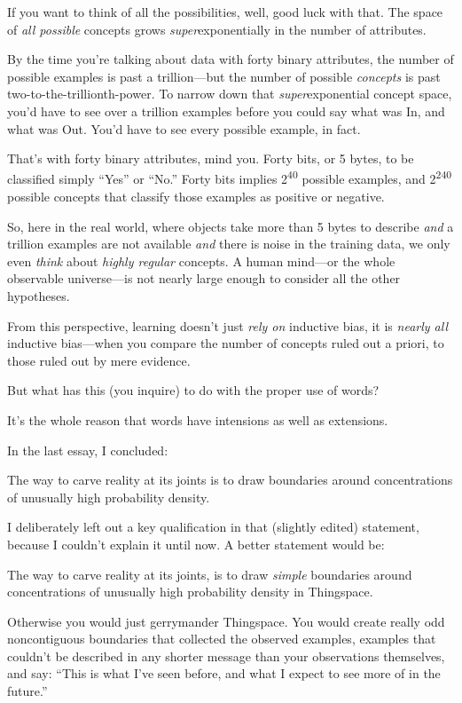 {
 If you want to think of all the possibilities, well, good luck
with that. The space of \textit{all possible} concepts grows
\textit{super}exponentially in the number of attributes.}

{
 By the time you're talking about data with forty
binary attributes, the number of possible examples is past a
trillion---but the number of possible \textit{concepts} is past
two-to-the-trillionth-power. To narrow down that
\textit{super}exponential concept space, you'd have to
see over a trillion examples before you could say what was In, and what
was Out. You'd have to see every possible example, in
fact.}

{
 That's with forty binary attributes, mind you.
Forty bits, or 5 bytes, to be classified simply
``Yes'' or
``No.'' Forty bits implies
2\textsuperscript{40} possible examples, and 2\textsuperscript{240}
possible concepts that classify those examples as positive or
negative.}

{
 So, here in the real world, where objects take more than 5 bytes
to describe \textit{and} a trillion examples are not available
\textit{and} there is noise in the training data, we only even
\textit{think} about \textit{highly regular} concepts. A human
mind---or the whole observable universe---is not nearly large enough to
consider all the other hypotheses.}

{
 From this perspective, learning doesn't just
\textit{rely on} inductive bias, it is \textit{nearly all} inductive
bias---when you compare the number of concepts ruled out a priori, to
those ruled out by mere evidence.}

{
 But what has this (you inquire) to do with the proper use of
words?}

{
 It's the whole reason that words have intensions
as well as extensions.}

{
 In the last essay, I concluded:}

{
 The way to carve reality at its joints is to draw boundaries
around concentrations of unusually high probability density.}

{
 I deliberately left out a key qualification in that (slightly
edited) statement, because I couldn't explain it until
now. A better statement would be:}

{
 The way to carve reality at its joints, is to draw \textit{simple}
boundaries around concentrations of unusually high probability density
in Thingspace.}

{
 Otherwise you would just gerrymander Thingspace. You would create
really odd noncontiguous boundaries that collected the observed
examples, examples that couldn't be described in any
shorter message than your observations themselves, and say:
``This is what I've seen before, and
what I expect to see more of in the future.''}

